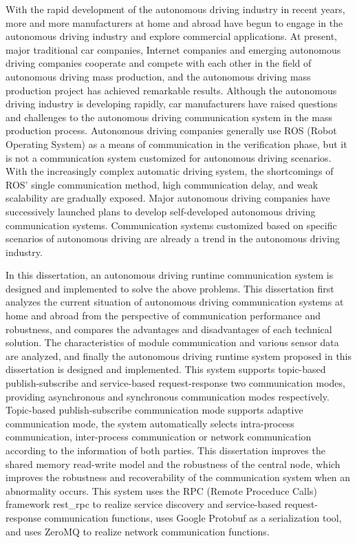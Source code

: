 \begin{abstract*}
  With the rapid development of the autonomous driving industry in recent years, 
  more and more manufacturers at home and abroad have begun to engage in the autonomous driving industry and explore commercial applications. 
  At present, major traditional car companies, 
  Internet companies and emerging autonomous driving companies cooperate and compete with each other in the field of autonomous driving mass production, 
  and the autonomous driving mass production project has achieved remarkable results. 
  Although the autonomous driving industry is developing rapidly, 
  car manufacturers have raised questions and challenges to the autonomous driving communication system in the mass production process. 
  Autonomous driving companies generally use ROS (Robot Operating System) as a means of communication in the verification phase, 
  but it is not a communication system customized for autonomous driving scenarios. 
  With the increasingly complex automatic driving system, 
  the shortcomings of ROS' single communication method, 
  high communication delay, and weak scalability are gradually exposed. 
  Major autonomous driving companies have successively launched plans to develop self-developed autonomous driving communication systems. 
  Communication systems customized based on specific scenarios of autonomous driving are already a trend in the autonomous driving industry.

  In this dissertation, an autonomous driving runtime communication system is designed and implemented to solve the above problems.
  This dissertation first analyzes the current situation of autonomous driving communication systems at home and abroad from the perspective of communication performance and robustness, 
  and compares the advantages and disadvantages of each technical solution.
  The characteristics of module communication and various sensor data are analyzed, and finally the autonomous driving runtime system proposed in this dissertation is designed and implemented.
  This system supports topic-based publish-subscribe and service-based request-response two communication modes, providing asynchronous and synchronous communication modes respectively.
  Topic-based publish-subscribe communication mode supports adaptive communication mode, the system automatically selects intra-process communication, 
  inter-process communication or network communication according to the information of both parties.
  This dissertation improves the shared memory read-write model and the robustness of the central node, 
  which improves the robustness and recoverability of the communication system when an abnormality occurs.
  This system uses the RPC (Remote Proceduce Calls) framework rest\_rpc to realize service discovery and service-based request-response communication functions, 
  uses Google Protobuf as a serialization tool, and uses ZeroMQ to realize network communication functions.


\end{abstract*}
